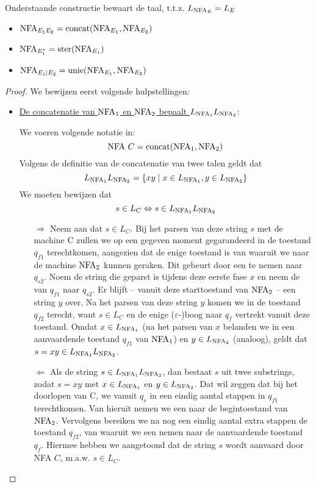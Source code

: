 \documentclass[../aanvullingen_cursus.tex]{subfiles}
\begin{document}
\begin{stelling}
	Onderstaande constructie bewaart de taal, t.t.z. \( L_{\text{NFA}_E}=L_E \)
	\begin{itemize}
		\item \( \text{NFA}_{E_1E_2}=\operatorname*{concat}(\text{NFA}_{E_1},\text{NFA}_{E_2}) \)
		\item \( \text{NFA}_{E_1^*}=\operatorname*{ster}(\text{NFA}_{E_1}) \)
		\item \( \text{NFA}_{E_1|E_2}=\operatorname*{unie}(\text{NFA}_{E_1},\text{NFA}_{E_2}) \)
	\end{itemize}
\end{stelling}

\begin{proof}
	We bewijzen eerst volgende hulpstellingen:
	\begin{itemize}
		\item \underline{De concatenatie van \( \text{NFA}_1 \) en \( \text{NFA}_2 \) bepaalt \( L_{\text{NFA}_1}L_{\text{NFA}_2} \)}:

		We voeren volgende notatie in: \[ \text{NFA } C = \operatorname*{concat}(\text{NFA}_{1},\text{NFA}_{2}) \] Volgens de definitie van de concatenatie van twee talen geldt dat \[ L_{\text{NFA}_1}L_{\text{NFA}_2}=\{xy \mid x \in L_{\text{NFA}_1}, y \in L_{\text{NFA}_2}\} \] We moeten bewijzen dat \[ s \in L_{C} \Leftrightarrow s \in L_{\text{NFA}_1}L_{\text{NFA}_2} \]
		\begin{enumerate}
			\item[\( \Rightarrow \)] Neem aan dat \( s \in L_C \). Bij het parsen van deze string \( s \) met de machine C zullen we op een gegeven moment gegarandeerd in de toestand \(q_{f1}\) terechtkomen, aangezien dat de enige toestand is van waaruit we naar de machine \( \text{NFA}_2 \) kunnen geraken. Dit gebeurt door een \epsilonboog  te nemen naar \( q_{s2} \). Noem de string die geparst is tijdens deze eerste fase \(x\) en neem de \epsilonboog van \( q_{f1} \) naar \( q_{s2} \). Er blijft -- vanuit deze starttoestand van \( \text{NFA}_2 \) -- een string \( y \) over. Na het parsen van deze string \( y \) komen we in de toestand \( q_{f2} \) terecht, want \( s \in L_C \) en de enige (\(\varepsilon\)-)boog naar \( q_f \) vertrekt vanuit deze toestand. Omdat \( x \in L_{\text{NFA}_1} \) (na het parsen van \( x \) belanden we in een aanvaardende toestand \( q_{f1} \) van \( \text{NFA}_1 \)) en \( y \in L_{\text{NFA}_2} \) (analoog), geldt dat \( s = xy \in L_{\text{NFA}_1}L_{\text{NFA}_2} \).
			\item[\(\Leftarrow\)] Als de string \( s \in L_{\text{NFA}_1}L_{\text{NFA}_2} \), dan bestaat \( s \) uit twee substrings, zodat \( s=xy \) met \( x \in L_{\text{NFA}_1} \) en \( y \in L_{\text{NFA}_2} \). Dat wil zeggen dat bij het doorlopen van C, we vanuit \( q_s \) in een eindig aantal stappen in \( q_{f1} \) terechtkomen. Van hieruit nemen we een \epsilonboog naar de begintoestand van \( \text{NFA}_2 \). Vervolgens bereiken we na nog een eindig aantal extra stappen de toestand \(q_{f2}\), van waaruit we een \epsilonboog nemen naar de aanvaardende toestand \(q_f\). Hiermee hebben we aangetoond dat de string \(s\) wordt aanvaard door NFA \(C\), m.a.w. \(s \in L_{C}.\)
		\end{enumerate}


\end{itemize}
\end{proof}
\end{document}
